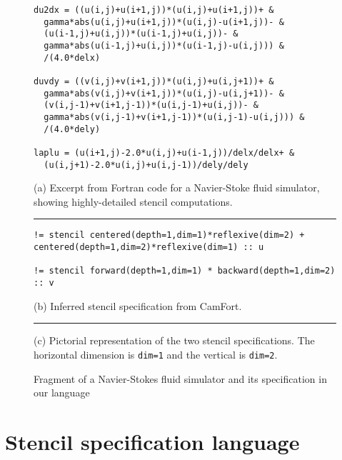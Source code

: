 \documentclass[9pt]{sigplanconf}
\theoremstyle{definition}
\begin{document}
\begin{figure}[t]
\begin{verbatim}
du2dx = ((u(i,j)+u(i+1,j))*(u(i,j)+u(i+1,j))+ &
  gamma*abs(u(i,j)+u(i+1,j))*(u(i,j)-u(i+1,j))- &
  (u(i-1,j)+u(i,j))*(u(i-1,j)+u(i,j))- &
  gamma*abs(u(i-1,j)+u(i,j))*(u(i-1,j)-u(i,j))) &
  /(4.0*delx)

duvdy = ((v(i,j)+v(i+1,j))*(u(i,j)+u(i,j+1))+ &
  gamma*abs(v(i,j)+v(i+1,j))*(u(i,j)-u(i,j+1))- &
  (v(i,j-1)+v(i+1,j-1))*(u(i,j-1)+u(i,j))- &
  gamma*abs(v(i,j-1)+v(i+1,j-1))*(u(i,j-1)-u(i,j))) &
  /(4.0*dely)

laplu = (u(i+1,j)-2.0*u(i,j)+u(i-1,j))/delx/delx+ &
  (u(i,j+1)-2.0*u(i,j)+u(i,j-1))/dely/dely
\end{verbatim}
(a) Excerpt from Fortran code for a Navier-Stoke fluid simulator,
showing highly-detailed stencil computations. 
\vspace{0.5em}
\hrule
%
\begin{verbatim}
!= stencil centered(depth=1,dim=1)*reflexive(dim=2) + centered(depth=1,dim=2)*reflexive(dim=1) :: u

!= stencil forward(depth=1,dim=1) * backward(depth=1,dim=2) :: v
\end{verbatim}
(b) Inferred stencil specification from CamFort.
\vspace{0.5em}
\hrule
%
\begin{center}
\end{center}
\vspace{-0.3em}
(c) Pictorial representation of the two stencil specifications.
The horizontal dimension is \texttt{dim=1} and the vertical is \texttt{dim=2}.
\caption{Fragment of a Navier-Stokes fluid simulator and its
  specification in our language}
\label{ref:navier-stokes-fragment}
\end{figure}

\section{Stencil specification language}
\label{sec:lang}
\end{document}
